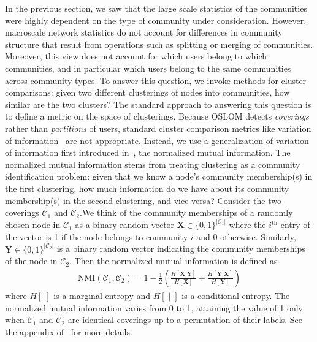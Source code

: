 In the previous section, we saw that the large scale statistics of the communities were highly dependent on the type of community under consideration. However, macroscale network statistics do not account for differences in community structure that result from operations such as splitting or merging of communities. Moreover, this view does not account for which users belong to which communities, and in particular which users belong to the same communities across community types. To answer this question, we invoke methods for cluster comparisons: given two different clusterings of nodes into communities, how similar are the two clusters? The standard approach to answering this question is to define a metric on the space of clusterings.  Because OSLOM detects \emph{coverings} rather than \emph{partitions} of users, standard cluster comparison metrics like variation of information~\cite{meilua2003comparing} are not appropriate. Instead, we use a generalization of variation of information first introduced in~\cite{lancichinetti2009detecting}, the normalized mutual information. The normalized mutual information stems from treating clustering as a community identification problem: given that we know a node's community membership(s) in the first clustering, how much information do we have about its community membership(s) in the second clustering, and vice versa? Consider the two coverings $\mathcal{C}_{1}$ and $\mathcal{C}_{2}.$We think of the community memberships of a randomly chosen node in $\mathcal{C}_{1}$ as a binary random vector $\mathbf{X} \in \{0, 1\}^{|\mathcal{C}_{1}|}$ where the $i^{\text{th}}$ entry of the vector is 1 if the node belongs to community $i$ and 0 otherwise. Similarly, $\mathbf{Y} \in \{ 0, 1\}^{|\mathcal{C}_{2}|}$ is a binary random vector indicating the community memberships of the node in $\mathcal{C}_{2}$. Then the normalized mutual information is defined as
\begin{align}
	\text{NMI}(\mathcal{C}_{1}, \mathcal{C}_{2}) = 1 - \frac{1}{2} \left( \frac{H[\mathbf{X} | \mathbf{Y}]}{H[\mathbf{X}]} + \frac{H[\mathbf{Y} | \mathbf{X}]}{H[\mathbf{Y}]}\right)
\end{align}
where $H[\cdot]$ is a marginal entropy and $H[\cdot | \cdot]$ is a conditional entropy. The normalized mutual information varies from 0 to 1, attaining the value of 1 only when $\mathcal{C}_{1}$ and $\mathcal{C}_{2}$ are identical coverings up to a permutation of their labels. See the appendix of~\cite{lancichinetti2009detecting} for more details.

